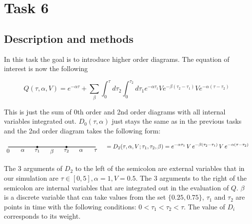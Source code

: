 \documentclass[a4paper, 11pt]{article}          %
\begin{document}
    \section{Task 6}

    \subsection{Description and methods}
    In this task the goal is to introduce higher order diagrams. The equation of interest is now the following

    \begin{equation}\label{eq:Q_order_2}
        Q(\tau, \alpha, V)= e^{-\alpha\tau}+\sum_{\beta}\int_0^{\tau} d\tau_2 \int_0^{\tau_2} d\tau_1 e^{-\alpha\tau_1} V e^{-\beta(\tau_2-\tau_1)}V e^{-\alpha(\tau-\tau_2)}
    \end{equation}

    This is just the sum of 0th order and 2nd order diagrams with all internal variables integrated out. $D_0(\tau, \alpha)$ just stays the same as in the previous tasks and the 2nd order diagram takes the following form:

    \begin{equation*}
        \label{eq:2nd_order_D}
        \begin{tikzpicture}[baseline=-0.5ex]
            \draw[thick] (0,0) -- (5.25,0);

            \filldraw (1.75,0) circle (1.5pt);
            \filldraw (3.5,0) circle (1.5pt);

            \node[below] at (0,0) {$0$};
            \node[below] at (0.875,0) {$\alpha$};
            \node[below] at (1.75,0) {$\tau_1$};
            \node[below] at (2.625,0) {$\beta$};
            \node[below] at (3.5,0) {$\tau_2$};
            \node[below] at (4.375,0) {$\alpha$};
            \node[below] at (5.25,0) {$\tau$};
        \end{tikzpicture}
        \quad = D_2(\tau, \alpha, V; \tau_1, \tau_2, \beta) = e^{-\alpha \tau_1} \, V \, e^{-\beta(\tau_2-\tau_1)} \, V \, e^{-\alpha(\tau-\tau_2)}
    \end{equation*}

    The 3 arguments of $D_2$ to the left of the semicolon are external variables that in our simulation are $\tau \in [0,5], \alpha=1, V=0.5$. The 3 arguments to the right of the semicolon are internal variables that are integrated out in the evaluation of $Q$. $\beta$ is a discrete variable that can take values from the set $\{0.25, 0.75\}$, $\tau_1$ and $\tau_2$ are points in time with the following conditions: $0 < \tau_1 < \tau_2 < \tau$. The value of $D_i$ corresponds to its weight.
\end{document}

